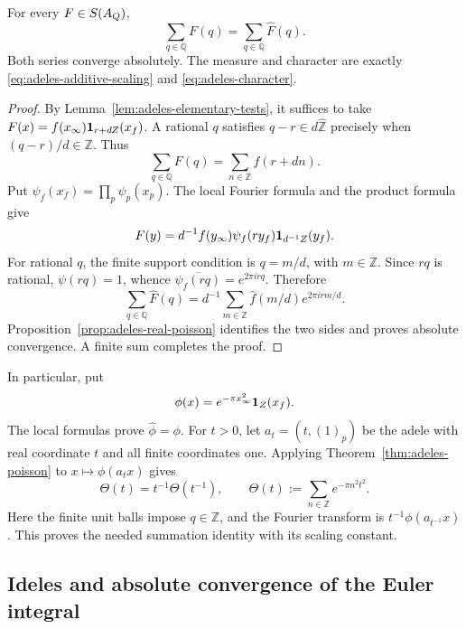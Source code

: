 \begin{theorem}
\label{thm:adeles-poisson}
For every \(F\in S(A_{Q})\),
\begin{equation}
 \sum_{q\in\mathbb Q}F(q)=\sum_{q\in\mathbb Q}\widehat F(q).
 \label{eq:adeles-poisson}
\end{equation}
Both series converge absolutely. The measure and character are exactly
\eqref{eq:adeles-additive-scaling} and \eqref{eq:adeles-character}.
\end{theorem}

\begin{proof}
By Lemma~\ref{lem:adeles-elementary-tests}, it suffices to take
\(F(x)=f(x_\infty)\mathbf 1_{r+dZ}(x_f)\).
A rational \(q\) satisfies \(q-r\in d\widehat{\mathbb Z}\) precisely when
\((q-r)/d\in\mathbb Z\). Thus
\[
 \sum_{q\in\mathbb Q}F(q)=\sum_{n\in\mathbb Z}f(r+dn).
\]
Put \(\psi_f(x_f)=\prod_p\psi_p(x_p)\).
The local Fourier formula and the product formula give
\[
 F(y)
 =d^{-1}f(y_\infty)
       \psi_f(ry_f)\mathbf 1_{d^{-1}Z}(y_f).
\]
For rational \(q\), the finite support condition is \(q=m/d\), with
\(m\in\mathbb Z\). Since \(rq\) is rational, \(\psi(rq)=1\), whence
\(\overline{\psi_f(rq)}=e^{2\pi irq}\). Therefore
\[
 \sum_{q\in\mathbb Q}\widehat F(q)
 =d^{-1}\sum_{m\in\mathbb Z}\widehat f(m/d)e^{2\pi irm/d}.
\]
Proposition~\ref{prop:adeles-real-poisson} identifies the two sides and
proves absolute convergence. A finite sum completes the proof.
\end{proof}

In particular, put
\[
 \phi(x)=e^{-\pi x_\infty^2}\mathbf 1_{Z}(x_f).
\]
The local formulas prove \(\widehat\phi=\phi\).
For \(t>0\), let \(a_t=(t,(1)_p)\) be the adele with real coordinate
\(t\) and all finite coordinates one. Applying
Theorem~\ref{thm:adeles-poisson} to \(x\mapsto\phi(a_tx)\) gives
\begin{equation}
 \Theta(t)=t^{-1}\Theta(t^{-1}),\qquad
 \Theta(t):=\sum_{n\in\mathbb Z}e^{-\pi n^2t^2}.
 \label{eq:adeles-theta}
\end{equation}
Here the finite unit balls impose \(q\in\mathbb Z\), and the Fourier
transform is \(t^{-1}\phi(a_{t^{-1}}x)\).
This proves the needed summation identity with its scaling constant.

\subsection{Ideles and absolute convergence of the Euler integral}
\label{sec:adeles-ideles}

